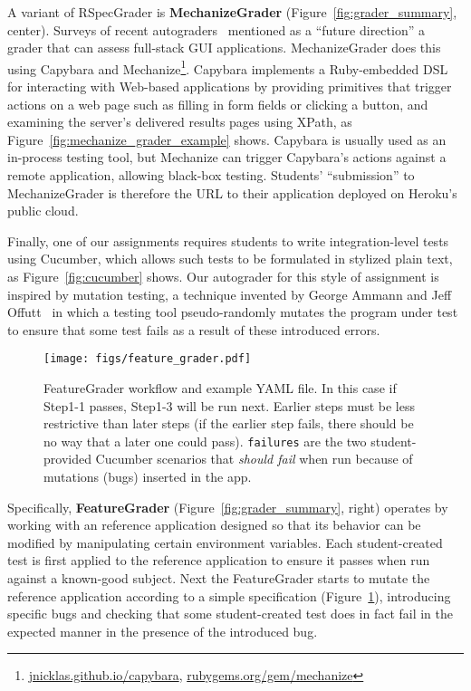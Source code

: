 A variant of RSpecGrader is \textbf{MechanizeGrader}  (Figure~\ref{fig:grader_summary}, center).
Surveys of recent
autograders~\cite{ihantola-2010-autograding-survey,douce-2005-autograding-survey}
mentioned as a ``future direction'' a grader that can assess full-stack
GUI applications.
MechanizeGrader does this using Capybara and
Mechanize\footnote{\url{jnicklas.github.io/capybara},
\url{rubygems.org/gem/mechanize}}.
Capybara implements a Ruby-embedded DSL for interacting with Web-based
applications by providing primitives that trigger actions on a web page
such as filling in form fields or clicking a button, and examining the
server's delivered results pages using XPath, as
Figure~\ref{fig:mechanize_grader_example} shows. 
Capybara is usually used as an in-process testing tool, but Mechanize
can trigger Capybara's actions against a remote application, allowing
black-box testing.
Students' ``submission'' to MechanizeGrader is therefore the URL to their
application deployed on Heroku's public 
cloud.

Finally, one of our assignments requires students to write integration-level
tests using Cucumber, which allows such tests to be formulated in
stylized plain text, as Figure~\ref{fig:cucumber} shows.
Our autograder for this
style of assignment is inspired by mutation testing, a technique invented
by George Ammann and Jeff 
Offutt~\cite{ammann-offutt-sw-testing} in which a
testing tool pseudo-randomly mutates the program under test to ensure
that some test fails as a result of these introduced errors.


\begin{figure}
  \begin{minipage}{0.45\textwidth}%
  \texttt{[image: figs/feature\_grader.pdf]}%
  \end{minipage}%
  \begin{minipage}{0.55\textwidth}%
  \end{minipage}
  \caption{\label{fig:featuregrader}%
FeatureGrader workflow and example YAML file.  In this case if Step1-1 passes,
Step1-3 will be run next.  Earlier steps must be less restrictive than
later steps (if the earlier step fails, there should be no way that a later one could pass).
\texttt{failures} are the two student-provided Cucumber scenarios that \emph{should fail} when
run because of mutations (bugs) inserted in the app.
}
\end{figure}


Specifically, \textbf{FeatureGrader}  (Figure~\ref{fig:grader_summary},
right)
operates by working with an
reference application designed so that its behavior can be modified by
manipulating certain environment variables.
Each student-created test   is first applied to the reference
application to ensure it passes when run against a known-good subject.
Next the FeatureGrader starts to mutate the reference application
according to a simple specification (Figure~\ref{fig:featuregrader}), 
introducing specific bugs and checking that some student-created test
does in fact fail in the expected manner in the presence of the
introduced bug.  

